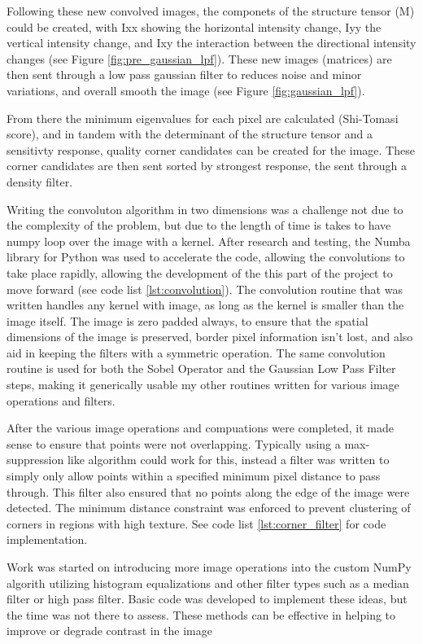 \documentclass[11pt, conference, letterpaper]{IEEEtran}
\begin{document}
Following these new convolved images, the componets of the structure tensor (M) could be created, with Ixx showing the horizontal intensity change, Iyy the vertical intensity change, and Ixy the interaction between the directional intensity changes (see Figure \ref{fig:pre_gaussian_lpf}). These new images (matrices) are then sent through a low pass gaussian filter to reduces noise and minor variations, and overall smooth the image (see Figure \ref{fig:gaussian_lpf}). 

From there the minimum eigenvalues for each pixel are calculated (Shi-Tomasi score), and in tandem with the determinant of the structure tensor and a sensitivty response, quality corner candidates can be created for the image. These corner candidates are then sent sorted by strongest response, the sent through a density filter.

Writing the convoluton algorithm in two dimensions was a challenge not due to the complexity of the problem, but due to the length of time is takes to have numpy loop over the image with a kernel. After research and testing, the Numba library for Python was used to accelerate the code, allowing the convolutions to take place rapidly, allowing the development of the this part of the project to move forward (see code list \ref{lst:convolution}). The convolution routine that was written handles any kernel with image, as long as the kernel is smaller than the image itself. The image is zero padded always, to ensure that the spatial dimensions of the image is preserved, border pixel information isn't lost, and also aid in keeping the filters with a symmetric operation. The same convolution routine is used for both the Sobel Operator and the Gaussian Low Pass Filter steps, making it generically usable my other routines written for various image operations and filters.

After the various image operations and compuations were completed, it made sense to ensure that points were not overlapping. Typically using a max-suppression like algorithm could work for this, instead a filter was written to simply only allow points within a specified minimum pixel distance to pass through. This filter also ensured that no points along the edge of the image were detected. The minimum distance constraint was enforced to prevent clustering of corners in regions with high texture. See code list \ref{lst:corner_filter} for code implementation.

Work was started on introducing more image operations into the custom NumPy algorith utilizing histogram equalizations and other filter types such as a median filter or high pass filter. Basic code was developed to implement these ideas, but the time was not there to assess. These methods can be effective in helping to improve or degrade contrast in the image
\bigskip
\end{document}
